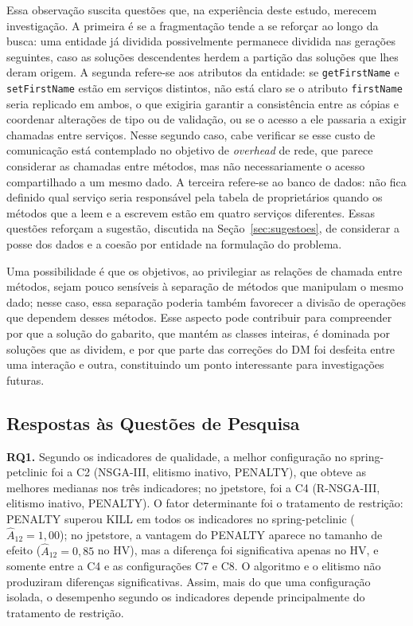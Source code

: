 \documentclass[conference]{IEEEtran}
\begin{document}
Essa observação suscita questões que, na experiência deste estudo, merecem investigação. A primeira é se a fragmentação tende a se reforçar ao longo da busca: uma entidade já dividida possivelmente permanece dividida nas gerações seguintes, caso as soluções descendentes herdem a partição das soluções que lhes deram origem. A segunda refere-se aos atributos da entidade: se \texttt{getFirstName} e \texttt{setFirstName} estão em serviços distintos, não está claro se o atributo \texttt{firstName} seria replicado em ambos, o que exigiria garantir a consistência entre as cópias e coordenar alterações de tipo ou de validação, ou se o acesso a ele passaria a exigir chamadas entre serviços. Nesse segundo caso, cabe verificar se esse custo de comunicação está contemplado no objetivo de \textit{overhead} de rede, que parece considerar as chamadas entre métodos, mas não necessariamente o acesso compartilhado a um mesmo dado. A terceira refere-se ao banco de dados: não fica definido qual serviço seria responsável pela tabela de proprietários quando os métodos que a leem e a escrevem estão em quatro serviços diferentes. Essas questões reforçam a sugestão, discutida na Seção~\ref{sec:sugestoes}, de considerar a posse dos dados e a coesão por entidade na formulação do problema.

Uma possibilidade é que os objetivos, ao privilegiar as relações de chamada entre métodos, sejam pouco sensíveis à separação de métodos que manipulam o mesmo dado; nesse caso, essa separação poderia também favorecer a divisão de operações que dependem desses métodos. Esse aspecto pode contribuir para compreender por que a solução do gabarito, que mantém as classes inteiras, é dominada por soluções que as dividem, e por que parte das correções do DM foi desfeita entre uma interação e outra, constituindo um ponto interessante para investigações futuras.

\subsection{Respostas às Questões de Pesquisa}\label{sec:res_rqs}

\textbf{RQ1.} Segundo os indicadores de qualidade, a melhor configuração no spring-petclinic foi a C2 (NSGA-III, elitismo inativo, PENALTY), que obteve as melhores medianas nos três indicadores; no jpetstore, foi a C4 (R-NSGA-III, elitismo inativo, PENALTY). O fator determinante foi o tratamento de restrição: PENALTY superou KILL em todos os indicadores no spring-petclinic ($\hat{A}_{12}=1{,}00$); no jpetstore, a vantagem do PENALTY aparece no tamanho de efeito ($\hat{A}_{12}=0{,}85$ no HV), mas a diferença foi significativa apenas no HV, e somente entre a C4 e as configurações C7 e C8. O algoritmo e o elitismo não produziram diferenças significativas. Assim, mais do que uma configuração isolada, o desempenho segundo os indicadores depende principalmente do tratamento de restrição.
\end{document}
